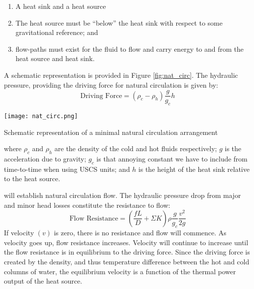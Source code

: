 \begin{enumerate}
\item A heat sink and a heat source
\item The heat source must be ``below'' the heat sink with respect to some gravitational reference; and
\item flow-paths must exist for the fluid to flow and carry energy to and from the heat source and heat sink.
\end{enumerate}
A schematic representation is provided in Figure \ref{fig:nat_circ}.  The hydraulic pressure, providing the driving force for natural circulation is given by:
$$\text{Driving Force} = \left(\rho_c - \rho_h \right) \frac{g}{g_c}h $$
\begin{marginfigure}
\texttt{[image: nat\_circ.png]}
\caption{Schematic representation of a minimal natural circulation arrangement}
\label{fig:nat_circ}
\end{marginfigure}
where $\rho_c$ and $\rho_h$ are the density of the cold and hot fluids respectively; $g$ is the acceleration due to gravity; $g_c$ is that annoying constant we have to include from time-to-time when using USCS units; and $h$ is the height of the heat sink relative to the heat source.

 will establish natural circulation flow.  The hydraulic pressure drop from major and minor head losses constitute the resistance to flow:
$$\text{Flow Resistance} = \left(\frac{fL}{D} + \Sigma K \right) \rho \frac{g}{g_c}\frac{v^2}{2g} $$
If velocity $(v)$ is zero, there is no resistance and flow will commence. As velocity goes up, flow resistance increases.  Velocity will continue to increase until the flow resistance is in equilibrium to the driving force.  Since the driving force is created by the density, and thus temperature difference between the hot and cold columns of water, the equilibrium velocity is a function of the thermal power output of the heat source. 

